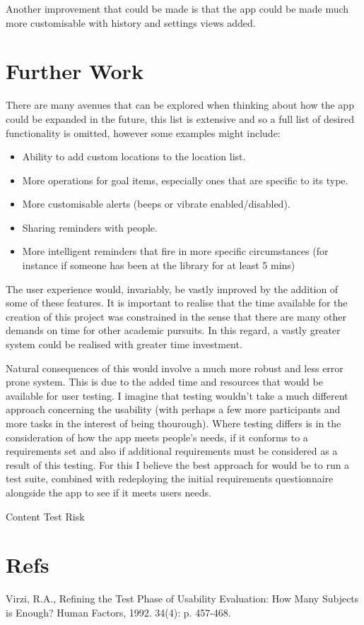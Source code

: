 \documentclass[12pt]{article} %
\begin{document}
Another improvement that could be made is that the app could be made much more customisable with history and settings views added.


\section{Further Work}

There are many avenues that can be explored when thinking about how the app could be expanded in the future, this list is extensive and so a full list of desired functionality is omitted, however some examples might include: 

\begin{itemize}
\item Ability to add custom locations to the location list.
\item More operations for goal items, especially ones that are specific to its type.
\item More customisable alerts (beeps or vibrate enabled/disabled).
\item Sharing reminders with people.
\item More intelligent reminders that fire in more specific circumstances (for instance if someone has been at the library for at least 5 mins)
\end{itemize}

The user experience would, invariably, be vastly improved by the addition of some of these features. It is important to realise that the time available for the creation of this project was constrained in the sense that there are many other demands on time for other academic pursuits. In this regard, a vastly greater system could be realised with greater time investment.

Natural consequences of this would involve a much more robust and less error prone system. This is due to the added time and resources that would be available for user testing. I imagine that testing wouldn't take a much different approach concerning the usability (with perhaps a few more participants and more tasks in the interest of being thourough). Where testing differs is in the consideration of how the app meets people's needs, if it conforms to a requirements set and also if additional requirements must be considered as a result of this testing. For this I believe the best approach for would be to run a test suite, combined with redeploying the initial requirements questionnaire alongside the app to see if it meets users needs.

Content
Test
Risk

\section{Refs}

Virzi, R.A., Refining the Test Phase of Usability Evaluation: How Many Subjects is Enough? Human Factors, 1992. 34(4): p. 457-468. 
\end{document}
